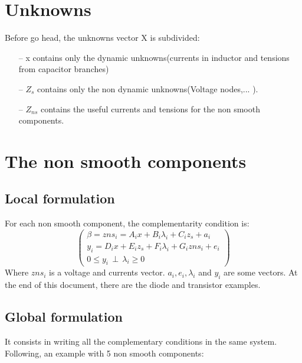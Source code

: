 
\section{Unknowns}
Before go head, the unknowns vector X is subdivided:
\begin{enumerate}
\item[--] x contains only the dynamic unknowns(currents in inductor and tensions from capacitor branches)
\item[--] $Z_{s}$ contains only the non dynamic unknowns(Voltage nodes,... ).
\item[--] $Z_{ns}$ contains the useful currents and tensions for the non smooth components.
\end{enumerate}

\section{The non smooth components}
\subsection{Local formulation}
For each non smooth component, the complementarity condition is:
\[\left(\begin{array}{c}
\beta = zns_{i} = A_{i}x+B_{i}\lambda_{i}+C_{i}z_{s} + a_{i}\\
y_{i}=D_{i}x+E_{i}z_{s}+F_{i}\lambda_{i}+G_{i}zns_{i}+e_{i}\\
0 \leq y_{i} \, \perp \, \lambda_{i} \geq 0
\end{array}\right)\]
Where $zns_{i}$ is a voltage and currents vector. $a_{i},e_{i},\lambda_{i}$ and $y_{i}$ are some vectors. At the end
of this document, there are the diode and transistor examples.


\subsection{Global formulation}
It consists in writing all the complementary conditions in the same system. Following, an example with 5 non smooth components:

